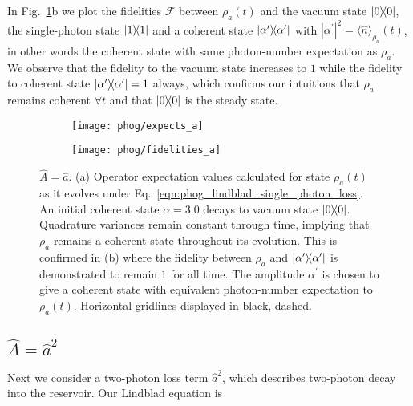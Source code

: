 In Fig.~\ref{fig:phog_lindblad_single_photon_loss}b we plot the fidelities $\mathcal{F}$ between $\rho_a\left(t\right)$ and the vacuum state $\dyad{0}$, the single-photon state $\dyad{1}$ and a coherent state $\dyad{\alpha^\prime}$ with $\left|\alpha^\prime\right|^2 = \langle \hat{n}\rangle_{\rho_a}\left(t\right)$, in other words the coherent state with same photon-number expectation as $\rho_a$. We observe that the fidelity to the vacuum state increases to $1$ while the fidelity to coherent state $\dyad{\alpha^\prime}=1$ always, which confirms our intuitions that $\rho_a$ remains coherent $\forall t$ and that $\dyad{0}$ is the steady state.


\begin{figure}[htp]
\centering
	\begin{subfigure}{0.6\linewidth}
	\centering
	\texttt{[image: phog/expects\_a]}
	\caption{}
	\end{subfigure}
	\begin{subfigure}{0.6\linewidth}
	\centering
	\texttt{[image: phog/fidelities\_a]}
	\caption{}
	\end{subfigure}
\caption{\label{fig:phog_lindblad_single_photon_loss}$\hat{A} = \hat{a}$. (a) Operator expectation values calculated for state $\rho_a\left(t\right)$ as it evolves under Eq.~\ref{eqn:phog_lindblad_single_photon_loss}. An initial coherent state $\alpha=3.0$ decays to vacuum state $\dyad{0}$. Quadrature variances remain constant through time, implying that $\rho_a$ remains a coherent state throughout its evolution. This is confirmed in (b) where the fidelity between $\rho_a$ and $\dyad{\alpha^\prime}$ is demonstrated to remain $1$ for all time. The amplitude $\alpha^\prime$ is chosen to give a coherent state with equivalent photon-number expectation to $\rho_a\left(t\right)$. Horizontal gridlines displayed in black, dashed.}
\end{figure}

\subsection{$\hat{A} = \hat{a}^2$}
Next we consider a two-photon loss term $\hat{a}^2$, which describes two-photon decay into the reservoir. Our Lindblad equation is

